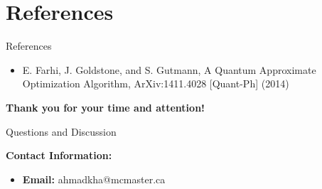\documentclass{beamer}
\begin{document}
\section{References}
\begin{frame}{References}
    \begin{itemize}
        \item  E. Farhi, J. Goldstone, and S. Gutmann, A Quantum Approximate Optimization Algorithm, ArXiv:1411.4028 [Quant-Ph] (2014)
    \end{itemize}
\end{frame}

\begin{frame}
    \begin{center}
        \textbf{Thank you for your time and attention!}
        \vspace{1cm}
        
        Questions and Discussion
        \vspace{1cm}
        
        \textbf{Contact Information:}
        \begin{itemize}
            \item \textbf{Email:} ahmadkha@mcmaster.ca
            
        \end{itemize}
    \end{center}
\end{frame}
\end{document}
